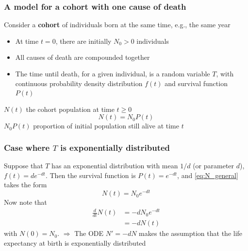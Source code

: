 \documentclass[aspectratio=169]{beamer}\usepackage[]{graphicx}\usepackage[]{xcolor}
\begin{document}
\begin{frame}\frametitle{A model for a cohort with one cause of death}
Consider a \textbf{cohort} of individuals born at the same time, e.g., the same year
\vfill
\begin{itemize}
\item At time $t=0$, there are initially $N_0>0$ individuals
\item All causes of death are compounded together 
\item The time until death, for a given individual, is a random variable $T$, with continuous probability density distribution $f(t)$ and survival function $P(t)$
\end{itemize}
\vfill
$N(t)$ the cohort population at time $t\geq 0$
\begin{equation}\label{eq:N_general}
N(t)=N_0P(t)
\end{equation}
\vfill
$N_0P(t)$ proportion of initial population still alive at time $t$
\end{frame}

\begin{frame}\frametitle{Case where $T$ is exponentially distributed}
Suppose that $T$ has an exponential distribution with mean $1/d$ (or parameter $d$), $f(t)=de^{-dt}$. Then the survival function is $P(t)=e^{-dt}$, and \eqref{eq:N_general} takes the form
\begin{equation}\label{eq:N}
N(t)=N_0e^{-dt}
\end{equation}
\vfill
Now note that
\begin{align*}
\frac{d}{dt} N(t) &= -dN_0e^{-dt} \\
&= -dN(t)
\end{align*}
with $N(0)=N_0$.
\vfill
{\red $\Rightarrow$} The ODE $N'=-dN$ makes the assumption that the life expectancy at birth is exponentially distributed
\end{frame}
\end{document}
